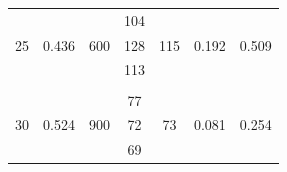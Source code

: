 \documentclass[%
 reprint,
nofootinbib,
 amsmath,amssymb,
 aps,
floatfix,
]{revtex4-2}
\begin{document}
\begin{table}[]
\begin{tabular}{@{}ccccccc@{}}
    \multirow{3}{*}{25}                                     & \multirow{3}{*}{0.436}                                         & \multirow{3}{*}{600}                                    & 104          & \multirow{3}{*}{115}                                                 & \multirow{3}{*}{0.192}                                              & \multirow{3}{*}{0.509}                                                            \\
                                                            &                                                                &                                                         & 128          &                                                                      &                                                                     &                                                                                   \\
                                                            &                                                                &                                                         & 113          &                                                                      &                                                                     &   \\                                                                                \\
    \multirow{3}{*}{30}                                     & \multirow{3}{*}{0.524}                                         & \multirow{3}{*}{900}                                    & 77           & \multirow{3}{*}{73}                                                  & \multirow{3}{*}{0.081}                                              & \multirow{3}{*}{0.254}                                                            \\
                                                            &                                                                &                                                         & 72           &                                                                      &                                                                     &                                                                                   \\
                                                            &                                                                &                                                         & 69           &                                                                      &                                                                     &   \\                                                                                 \bottomrule
    \end{tabular}
    \end{table}
\end{document}
